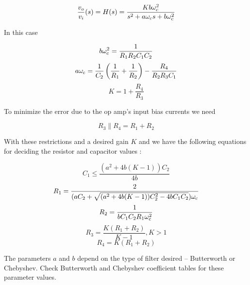 \textcolor{red}{
\begin{equation}
\frac{\vout}{\vin}(s) = \Hs = \frac{K b \wcutoff^2}{s^{2} + a\wcutoff s + b\wcutoff^2}
\label{eq:2ndorder_vcvs_LPfilter}
\end{equation}
}

In this case

\begin{equation}
b\omega_\mathrm{c}^2 = \frac{1}{R_1 R_2 C_1 C_2}
\end{equation}
\begin{equation}
a\omega_\mathrm{c} = \frac{1}{C_2}\left(\frac{1}{R_1} + \frac{1}{R_2}\right) - \frac{R_4}{R_2 R_3 C_1}
\end{equation}
\begin{equation}
K = 1 + \frac{R_4}{R_3}
\end{equation}

To minimize the error due to the op amp's input bias currents we need

\begin{equation}
R_3 \parallel R_4 = R_1 + R_2
\end{equation}

With these restrictions and a desired gain $K$ and \wcutoff we have the following equations for deciding the resistor and capacitor values \autocite[118-119]{op-amp-circuits-johnson}:

\begin{equation}
C_1 \leq \frac{(a^2 + 4b(K-1))C_2}{4b}
\end{equation}
\begin{equation}
R_1 = \frac{2}{(a C_2+\sqrt{(a^2 + 4b(K-1))C_2^2 - 4b C_1 C_2})\omega_\mathrm{c}}
\end{equation}
\begin{equation}
R_2 = \frac{1}{bC_1 C_2 R_1\omega_\mathrm{c}^2}
\end{equation}
\begin{equation}
R_3 = \frac{K(R_1 + R_2)}{K-1}, K > 1
\end{equation}
\begin{equation}
R_4 = K(R_1 + R_2)
\end{equation}

The parameters $a$ and $b$ depend on the type of filter desired -- Butterworth or Chebyshev.
Check Butterworth and Chebyshev coefficient tables for these parameter values.

